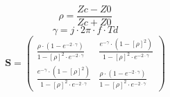 \[ \rho =  \frac{ Zc-Z0 }{ Zc + Z0 } \]
\[ \gamma =  j \cdot 2 \pi \cdot f \cdot Td \]
\[ \mathbf{S} = \left(\begin{array}{cc}  \frac{ \rho \cdot \left( 1 -
e^{-2 \cdot \gamma }  \right) }{ 1 - \left[ \rho \right]^2 \cdot e^{-2
\cdot \gamma }  } &  \frac{ e^{-\gamma} \cdot \left( 1 - \left[ \rho
\right] ^2 \right) }{ 1 - \left[ \rho \right]^2 \cdot e^{-2 \cdot
\gamma }  }  \\  \frac{ e^{-\gamma} \cdot \left( 1 - \left[ \rho
\right] ^2 \right) }{ 1 - \left[ \rho \right]^2 \cdot e^{-2 \cdot
\gamma }  }  &  \frac{ \rho \cdot \left( 1 - e^{-2 \cdot \gamma }
\right) }{ 1 - \left[ \rho \right]^2 \cdot e^{-2 \cdot \gamma }  }
\end{array}\right) \]
